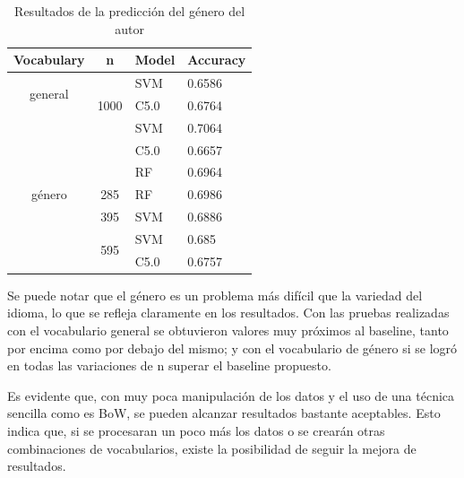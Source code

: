\documentclass[11pt,a4paper]{article}
\begin{document}
\begin{table}[H]
\centering
\begin{tabular}{|c|c|l|l|}
\hline
Vocabulary               & n                     & \multicolumn{1}{c|}{Model} & \multicolumn{1}{c|}{Accuracy} \\ \hline
\multirow{2}{*}{general} & \multirow{3}{*}{1000} & SVM                        & 0.6586                        \\ \cline{3-4} 
                         &                       & C5.0                       & 0.6764                        \\ \hline
\multirow{7}{*}{género}  & \multirow{3}{*}{185}  & SVM                        & 0.7064                        \\ \cline{3-4} 
                         &                       & C5.0                       & 0.6657                        \\ \cline{3-4} 
                         &                       & RF                         & 0.6964                        \\ \cline{2-4} 
                         & 285                   & RF                         & 0.6986                        \\ \cline{2-4} 
                         & 395                   & SVM                        & 0.6886                        \\ \cline{2-4} 
                         & \multirow{2}{*}{595}  & SVM                        & 0.685                         \\ \cline{3-4} 
                         &                       & C5.0                       & 0.6757                        \\ \hline
\end{tabular}
\caption{Resultados de la predicción del género del autor}
\end{table}

Se puede notar que el género es un problema más difícil que la variedad del idioma, lo que se refleja claramente en los resultados. Con las pruebas realizadas con el vocabulario general se obtuvieron valores muy próximos al baseline, tanto por encima como por debajo del mismo; y con el vocabulario de género si se logró en todas las variaciones de n superar el baseline propuesto.

Es evidente que, con muy poca manipulación de los datos y el uso de una técnica sencilla como es BoW, se pueden alcanzar resultados bastante aceptables. Esto indica que, si se procesaran un poco más los datos o se crearán otras combinaciones de vocabularios, existe la posibilidad de seguir la mejora de resultados.
\end{document}
